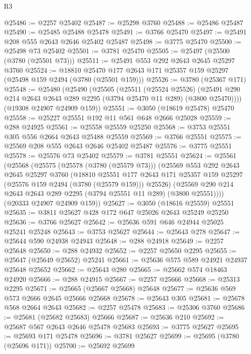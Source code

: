 \begin{lexlean}{R3}
\begin{coremodule}
@25486 := @2257 @25402
@25487 := @25298 @3760
@25488 := @25486 @25487
@25490 := @25485 @25488 @25478
@25491 := @3766 @25470
@25497 := @25491 @208 @555 @2643 @2646 @25402 @25487
@25498 := @3775 @25470
@25500 := @25498 @73 @25402
@25501 := @3781 @25470
@25505 := @25497 (@25500 (@3780 (@25501 @73)))
@25511 := @25491 @553 @292 @2643 @2645 @25297 @3760
@25524 := @18810 @25470 @177 @2643 @171 @25357 @159 @25297 (@25498 @159 @2494 (@3780 (@25501 @159)))
@25526 := @3780 (@25367 @171)
@25548 := @25480
    (@25490
      (@25505
        (@25511
          (@25524 @25526)
          (@25491 @290 @214 @2643 @2643 @289 @2295 (@3794 @25470 @11 @289) (@3800 @25470))))
      (@19308 @24907 @24909 @159))
@25551 := @3050 (@18619 @25478) @25470
@25558 := @25227 @25551 @192 @11 @561 @648 @2666 @25028
@25559 := @288 @24925
@25561 := @25558 @25559 @25250
@25568 := @3753 @25551 @305 @556 @2664 @2643 @25488 @25559
@25569 := @3766 @25551
@25575 := @25569 @208 @555 @2643 @2646 @25402 @25487
@25576 := @3775 @25551
@25578 := @25576 @73 @25402
@25579 := @3781 @25551
@25624 := @25561
    (@25568
      (@25575
        (@25578 (@3780 (@25579 @73)))
        (@25569
          @553
          @292
          @2643
          @2645
          @25297
          @3760
          (@18810
            @25551
            @177
            @2643
            @171
            @25357
            @159
            @25297
            (@25576 @159 @2494 (@3780 (@25579 @159)))
            @25526)
          (@25569 @290 @214 @2643 @2643 @289 @2295 (@3794 @25551 @11 @289) (@3800 @25551))))
      (@20333 @24907 @24909 @159))
@25627 := @3050 (@18616 @25559) @25551
@25635 := @3811 @25627 @428 @172 @647 @25026 @2643 @25249 @25250
@25636 := @3766 @25627
@25642 := @25636 @591 @646 @24944 @25025 @25241 @25248
@25643 := @3753 @25627
@25644 := @25643 @278
@25647 := @25644 @590 @24938 @24943
@25648 := @288 @24918
@25649 := @2257 @25648
@25650 := @288 @24932
@25652 := @2257 @25650 @2295
@25655 := @25647 (@25649 @25652) @25241
@25661 := @25636 @575 @589 @24921 @24937 @25648 @25652
@25662 := @25643 @280
@25665 := @25662 @574 @18463 @24920
@25666 := @288 @24915
@25667 := @2257 @25666
@25668 := @25313 @2295
@25671 := @25665 (@25667 @25668) @25648
@25677 := @25636 @569 @573 @2666 @2645 @25666 @25668
@25678 := @25643 @305
@25681 := @25678 @568 @2664 @2643
@25682 := @2257 @25478
@25683 := @25306 @3760
@25686 := @25681 (@25682 @25683) @25666
@25687 := @25636 @210
@25692 := @25687 @567 @2643 @2646 @25478 @25683
@25693 := @3775 @25627
@25695 := @25693 @171 @25478
@25696 := @3781 @25627
@25699 := @25695 (@3780 (@25696 @171))
@25700 := @25692 @25699

\end{coremodule}
\end{lexlean}

